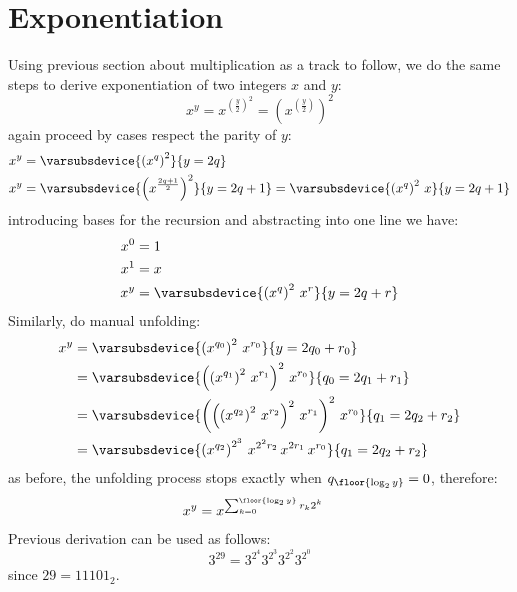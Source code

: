 \section{Exponentiation}

Using previous section about multiplication as a track to follow, 
we do the same steps to derive exponentiation of two integers $x$ and $y$:
\begin{displaymath}
    x^{y} = x^{\left(\frac{y}{2}\right)^{2}} = \left(x^{\left(\frac{y}{2}\right)}\right)^{2} 
\end{displaymath}
again proceed by cases respect the parity of $y$:
\begin{displaymath}
    \begin{split}
        x^{y} &= \varsubsdevice{\left(x^{q}\right)^{2}}{y=2q}\\
        x^{y} &= \varsubsdevice{\left(x^{\frac{2q+1}{2}}\right)^{2}}{y=2q+1}
               = \varsubsdevice{\left(x^{q}\right)^{2}\,x}{y=2q+1}\\
    \end{split}
\end{displaymath}
introducing bases for the recursion and abstracting into one line we have:
\begin{displaymath}
    \begin{split}
        x^{0} &= 1\\
        x^{1} &= x\\
        x^{y} &= \varsubsdevice{\left(x^{q}\right)^{2}\,x^{r}}{y=2q+r}\\
    \end{split}
\end{displaymath}
Similarly, do manual unfolding:
\begin{displaymath}
    \begin{split}
        x^{y} &= \varsubsdevice{\left(x^{q_{0}}\right)^{2}\,x^{r_{0}}}{y=2q_{0}+r_{0}}\\
              &= \varsubsdevice{\left(\left(x^{q_{1}}\right)^{2}\,x^{r_{1}}\right)^{2}\,x^{r_{0}}}{q_{0}=2q_{1}+r_{1}}\\
              &= \varsubsdevice{\left(\left(\left(x^{q_{2}}\right)^{2}\,x^{r_{2}}\right)^{2}\,x^{r_{1}} \right)^{2}\,x^{r_{0}}}
                    {q_{1}=2q_{2}+r_{2}}\\
              &= \varsubsdevice{\left(x^{q_{2}}\right)^{2^{3}}\,x^{2^{2}r_{2}}\,x^{2r_{1}}\,x^{r_{0}}}{q_{1}=2q_{2}+r_{2}}\\
    \end{split}
\end{displaymath}
as before, the unfolding process stops exactly when $q_{\floor{\log_{2}{y}}}=0$, therefore:
\begin{align}
    x^{y} &= x^{\sum_{k=0}^{\floor{\log_{2}{y}}}{r_{k}2^{k}}}
\end{align}
Previous derivation can be used as follows:
\begin{displaymath}
    3^{29} = 3^{2^{4}}3^{2^{3}}3^{2^{2}}3^{2^{0}}
\end{displaymath}
since $29 = {11101}_{2}$.
